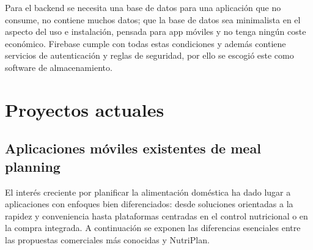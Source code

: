 \documentclass[twoside, openright, 11pt]{report}
\begin{document}
		Para el backend se necesita una base de datos para una aplicación que no consume, no contiene muchos datos; que la base de datos sea minimalista en el aspecto del uso e instalación, pensada para app móviles y no tenga ningún coste económico. Firebase cumple con todas estas condiciones y además contiene servicios de autenticación y reglas de seguridad, por ello se escogió este como software de almacenamiento.
		
		
  	
	\section{Proyectos actuales}
		\subsection*{Aplicaciones móviles existentes de meal planning}
		El interés creciente por planificar la alimentación doméstica ha dado lugar a aplicaciones con enfoques bien diferenciados: desde soluciones orientadas a la rapidez y conveniencia hasta plataformas centradas en el control nutricional o en la compra integrada. A continuación se exponen las diferencias esenciales entre las propuestas comerciales más conocidas y NutriPlan.
		
\end{document}
